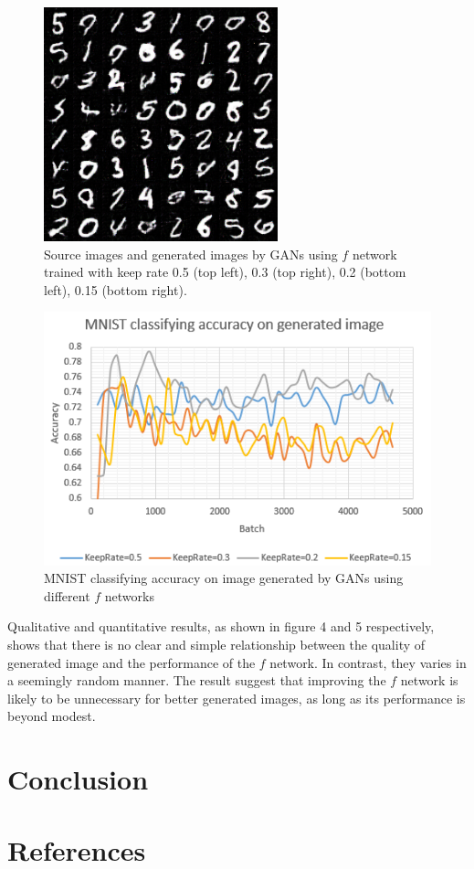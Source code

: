 \documentclass{article}
\begin{document}
\begin{figure}[H]
	\includegraphics[width = 5 cm]{img/4000_0000_gen_D015.png}
	\caption{Source images and generated images by GANs using $f$ network trained with keep rate 0.5 (top left), 0.3 (top right), 0.2 (bottom left), 0.15 (bottom right).}
\end{figure}

\begin{figure}[H]
	\centering
	\includegraphics[width = 10 cm]{img/plot2.png}
	\caption{MNIST classifying accuracy on image generated by GANs using different $f$ networks}
\end{figure}

Qualitative and quantitative results, as shown in figure 4 and 5 respectively, shows that there is no clear and simple relationship between the quality of generated image and the performance of the $f$ network. In contrast, they varies in a seemingly random manner. The result suggest that improving the $f$ network is likely to be unnecessary for better generated images, as long as its performance is beyond modest.

\section{Conclusion}

\section*{References}
\end{document}
